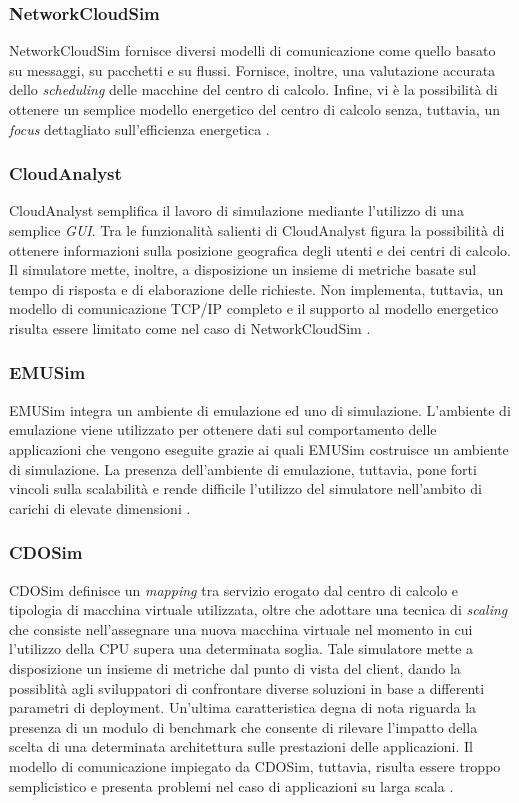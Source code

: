 {\subsubsection{NetworkCloudSim}
NetworkCloudSim  \cite{garg2011networkcloudsim} fornisce diversi modelli di comunicazione come quello basato su messaggi, su pacchetti e su flussi. Fornisce, inoltre, una valutazione accurata dello \emph{scheduling} delle macchine del centro di calcolo. Infine, vi è la possibilità di ottenere un semplice modello energetico del centro di calcolo senza, tuttavia, un \emph{focus} dettagliato sull'efficienza energetica \cite{mansouri2020cloud}.
\subsubsection*{CloudAnalyst}
CloudAnalyst \cite{wickremasinghe2010cloudanalyst} semplifica il lavoro di simulazione mediante l'utilizzo di una semplice \emph{GUI}. Tra le funzionalità salienti di CloudAnalyst figura la possibilità di ottenere informazioni sulla posizione geografica degli utenti e dei centri di calcolo. Il simulatore mette, inoltre, a disposizione un insieme di metriche basate sul tempo di risposta e di elaborazione delle richieste. Non implementa, tuttavia, un modello di comunicazione TCP/IP completo e il supporto al modello energetico risulta essere limitato come nel caso di NetworkCloudSim \cite{mansouri2020cloud}. 
\subsubsection{EMUSim}
EMUSim \cite{calheiros2013emusim} integra un ambiente di emulazione ed uno di simulazione. L'ambiente di emulazione viene utilizzato per ottenere dati sul comportamento delle applicazioni che vengono eseguite grazie ai quali EMUSim costruisce un ambiente di simulazione. La presenza dell'ambiente di emulazione, tuttavia, pone forti vincoli sulla scalabilità e rende difficile l'utilizzo del simulatore nell'ambito di carichi di elevate dimensioni \cite{mansouri2020cloud}. 
\subsubsection*{CDOSim}
CDOSim \cite{fittkau2012cdosim} definisce un \emph{mapping} tra servizio erogato dal centro di calcolo e tipologia di macchina virtuale utilizzata, oltre che adottare una tecnica di \emph{scaling} che consiste nell'assegnare una nuova macchina virtuale nel momento in cui l'utilizzo della CPU supera una determinata soglia. Tale simulatore mette a disposizione un insieme di metriche dal punto di vista del client, dando la possiblità agli sviluppatori di confrontare diverse soluzioni in base a differenti parametri di deployment. Un'ultima caratteristica degna di nota riguarda la presenza di un modulo di benchmark che consente di rilevare l'impatto della scelta di una determinata architettura sulle prestazioni delle applicazioni. Il modello di comunicazione impiegato da CDOSim, tuttavia, risulta essere troppo semplicistico e presenta problemi nel caso di applicazioni su larga scala \cite{mansouri2020cloud}.  
}
